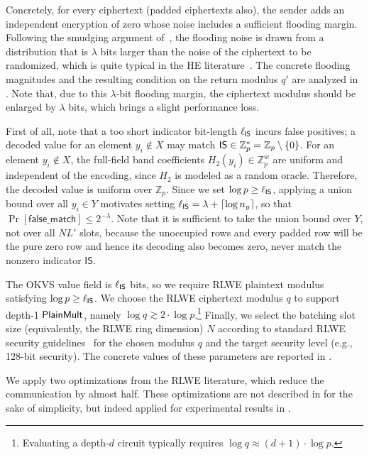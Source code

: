 Concretely, for every ciphertext (padded ciphertexts also), the sender adds an independent encryption of zero whose noise includes a sufficient flooding margin.
Following the smudging argument of~\cite{AJLA+12}, the flooding noise is drawn from a distribution that is $\lambda$ bits larger than the noise of the ciphertext to be randomized, which is quite typical in the HE literature~\cite{CLR17}.
The concrete flooding magnitudes and the resulting condition on the return modulus $q'$ are analyzed in .
Note that, due to this $\lambda$-bit flooding margin, the ciphertext modulus should be enlarged by $\lambda$ bits, which brings a slight performance loss.


First of all, note that a too short indicator bit-length $\ell_{\sf IS}$ incurs false positives; a decoded value for an element $y_i \notin X$ may match ${\sf IS} \in \mathbb{Z}_p^{\ast}=\mathbb{Z}_p \setminus \{0\}$.
For an element $y_i\notin X$, the full-field band coefficients $H_2(y_i)\in\mathbb Z_p^w$ are uniform and independent of the encoding, since $H_2$ is modeled as a random oracle.
Therefore, the decoded value is uniform over $\mathbb Z_p$. 
Since we set $\log p \ge \ell_{\sf IS}$, applying a union bound over all $y_i \in Y$ motivates setting $\ell_{\sf IS} = \lambda + \lceil \log n_y \rceil$, so that $\Pr[\mathsf{false\_match}] \le 2^{-\lambda}$.
Note that it is sufficient to take the union bound over $Y$, not over all $NL'$ slots, because the unoccupied rows and every padded row will be the pure zero row and hence its decoding also becomes zero, never match the nonzero indicator $\mathsf{IS}$.

The OKVS value field is $\ell_{\sf IS}$ bits, so we require RLWE plaintext modulus satisfying $\log p \ge \ell_{\sf IS}$.
We choose the RLWE ciphertext modulus $q$ to support depth-1 ${\sf PlainMult}$, namely $\log q \gtrsim 2 \cdot \log p$.\footnote{Evaluating a depth-$d$ circuit typically requires $\log q \approx (d+1)\cdot \log p$.}
Finally, we select the batching slot size (equivalently, the RLWE ring dimension) $N$ according to standard RLWE security guidelines~\cite{HEStandard} for the chosen modulus $q$ and the target security level (e.g., 128-bit security). The concrete values of these parameters are reported in .

We apply two optimizations from the RLWE literature, which reduce the communication by almost half. These optimizations are not described in  for the sake of simplicity, but indeed applied for experimental results in .

